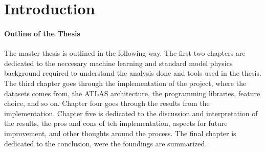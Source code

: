 \chapter*{Introduction}



\subsubsection*{Outline of the Thesis}
The master thesis is outlined in the following way. The first two chapters are dedicated to the neccesary machine learning and
standard model physics background required to understand the analysis done and tools used in the thesis. The third chapter goes 
through the implementation of the project, where the datasets comes from, the ATLAS architecture, the programming libraries, 
feature choice, and so on. Chapter four goes through the results from the implementation. Chapter five is dedicated to the discussion and 
interpretation of the results, the pros and cons of teh implementation, aspects for future improvement, and other thoughts around the process.
The final chapter is dedicated to the conclusion, were the foundings are summarized. 


